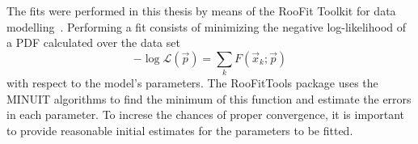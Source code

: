 

The fits were performed in this thesis by means of the RooFit Toolkit for data modelling~\cite{RooFit}. Performing a fit consists of minimizing the negative log-likelihood of a PDF calculated over the data set %
%
\begin{equation}
-\log \mathcal{L} (\vec{p}) = \sum_k F(\vec{x}_k;\vec{p})
\end{equation}
%
with respect to the model's parameters.  The RooFitTools package uses the MINUIT\cite{MINUIT} algorithms to find the minimum of this function and estimate the errors in each parameter.  %
To increse the chances of proper convergence, it is important to provide reasonable initial estimates for the parameters to be fitted.



